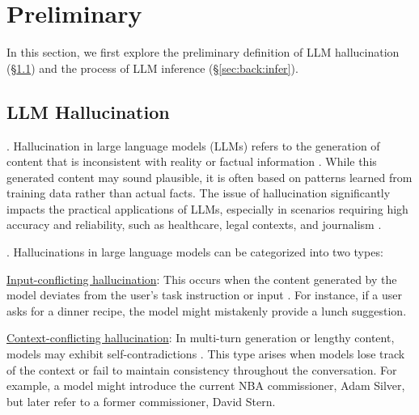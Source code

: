 \section{Preliminary}\label{sec:back}

In this section, we first explore the preliminary definition of LLM hallucination (\S\ref{sec:back:halu}) and the process of LLM inference (\S\ref{sec:back:infer}).

\subsection{LLM Hallucination}\label{sec:back:halu}

.
Hallucination in large language models (LLMs) refers to the generation of content that is inconsistent with reality or factual information \cite{tonmoy2024comprehensive, rawte2023survey, huang2023survey}. 
While this generated content may sound plausible, it is often based on patterns learned from training data rather than actual facts. 
The issue of hallucination significantly impacts the practical applications of LLMs, especially in scenarios requiring high accuracy and reliability, such as healthcare, legal contexts, and journalism \cite{zhang2023siren}.

.
Hallucinations in large language models can be categorized into two types:
\begin{enumerate}[label={[\arabic*]}, itemsep=0pt, leftmargin=*,topsep=0pt]
    \item \underline{Input-conflicting hallucination}: This occurs when the content generated by the model deviates from the user’s task instruction or input \cite{tonmoy2024comprehensive, rawte2023survey}. For instance, if a user asks for a dinner recipe, the model might mistakenly provide a lunch suggestion.
    \item \underline{Context-conflicting hallucination}: In multi-turn generation or lengthy content, models may exhibit self-contradictions \cite{tonmoy2024comprehensive, huang2023survey, zhang2023siren}. This type arises when models lose track of the context or fail to maintain consistency throughout the conversation. For example, a model might introduce the current NBA commissioner, Adam Silver, but later refer to a former commissioner, David Stern.
\end{enumerate}

